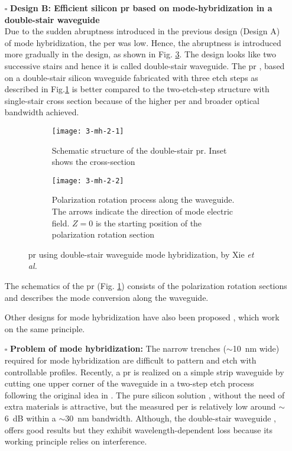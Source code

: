 \documentclass[../report.tex]{subfiles}
\begin{document}
\begin{itemize}[leftmargin=*]
	\item[$\square$] \textbf{Design B: Efficient silicon \gls{pr} based on mode-hybridization in a double-stair waveguide}\\
	Due to the sudden abruptness introduced in the previous design (Design A) of mode hybridization, the \gls{per} was low. Hence, the abruptness is introduced more gradually in the design, as shown in Fig. \ref{fig:3_mh_2_2}. The design looks like two successive stairs and hence it is called double-stair waveguide. The \gls{pr} \cite{xie_efficient_2015}, based on a double-stair silicon waveguide fabricated with three etch steps as described in Fig.\ref{fig:3_mh_2_1} is better compared to the two-etch-step structure with single-stair cross section \cite{aamer_cmos_2012} because of the higher \gls{per} and broader optical bandwidth achieved. 
	\begin{figure}[H] %
		\begin{subfigure}[t]{0.45\textwidth}
			\texttt{[image: 3-mh-2-1]}
			\caption{Schematic structure of the double-stair \gls{pr}. Inset shows the cross-section}
			\label{fig:3_mh_2_1}
		\end{subfigure}
		\hfill
		\begin{subfigure}[t]{0.45\textwidth}
			\texttt{[image: 3-mh-2-2]}
			\caption{Polarization rotation process along the waveguide. The arrows indicate the direction of mode electric field. $Z = 0$ is the starting position of the polarization rotation section}
			\label{fig:3_mh_2_2}
		\end{subfigure}
		\caption{\gls{pr} using double-stair waveguide mode hybridization, by Xie \textit{et al.} \cite{xie_efficient_2015}}
	\end{figure}
	\noindent The schematics of the \gls{pr} (Fig. \ref{fig:3_mh_2_1}) consists of the polarization rotation sections and describes the mode conversion along the waveguide.\par
	
	Other designs for mode hybridization have also been proposed \cite{fukuda_integrated_2008,vermeulen_Silicon_2012}, which work on the same principle.
	
	\item[$\square$] \textbf{Problem of mode hybridization:} The narrow trenches ($\sim$\SI{10}{\nano\meter} wide) required for mode hybridization are difficult to pattern and etch with controllable profiles. Recently, a \gls{pr} \cite{aamer_cmos_2012} is realized on a simple strip waveguide by cutting one upper corner of the waveguide in a two-step etch process following the original idea in \cite{wang_ultrasmall_2008}. The pure silicon solution \cite{aamer_cmos_2012}, without the need of extra materials is attractive, but the measured \gls{per} is relatively low around $\sim$\SI{6}{\deci\bel} within a $\sim$\SI{30}{\nano\meter} bandwidth. Although, the double-stair waveguide \cite{xie_efficient_2015}, offers good results but they exhibit wavelength-dependent loss because its working principle relies on interference.
			
\end{itemize}
		
\end{document}
